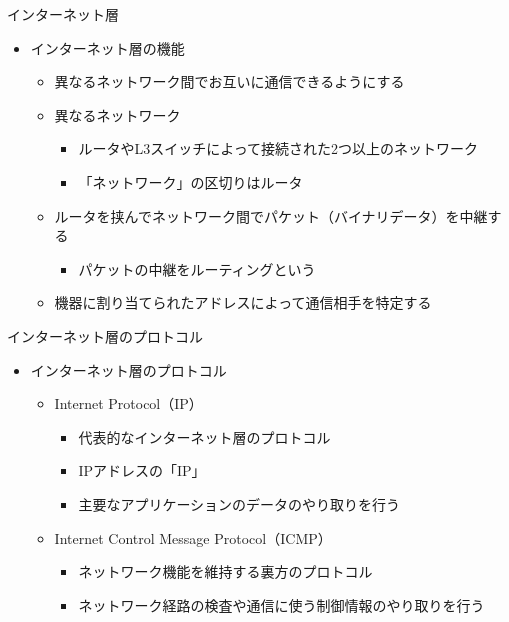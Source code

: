 \documentclass[12pt,aspectratio=169]{beamer}
\begin{document}
\begin{frame}{インターネット層}

  \begin{itemize}
    \item インターネット層の機能
      \begin{itemize}
        \item 異なるネットワーク間でお互いに通信できるようにする
        \item 異なるネットワーク
          \begin{itemize}
            \item ルータやL3スイッチによって接続された2つ以上のネットワーク
            \item 「ネットワーク」の区切りはルータ
          \end{itemize}

          \item ルータを挟んでネットワーク間でパケット（バイナリデータ）を中継する
            \begin{itemize}
              \item パケットの中継をルーティングという
            \end{itemize}
          \item 機器に割り当てられたアドレスによって通信相手を特定する

      \end{itemize}

  \end{itemize}

\end{frame}


\begin{frame}{インターネット層のプロトコル}

  \begin{itemize}
    \item インターネット層のプロトコル
      \begin{itemize}
        \item Internet Protocol（IP）
          \begin{itemize}
            \item 代表的なインターネット層のプロトコル
            \item IPアドレスの「IP」
            \item 主要なアプリケーションのデータのやり取りを行う
          \end{itemize}

        \item Internet Control Message Protocol（ICMP）
          \begin{itemize}
            \item ネットワーク機能を維持する裏方のプロトコル
            \item ネットワーク経路の検査や通信に使う制御情報のやり取りを行う
          \end{itemize}

      \end{itemize}
  \end{itemize}

\end{frame}
\end{document}
